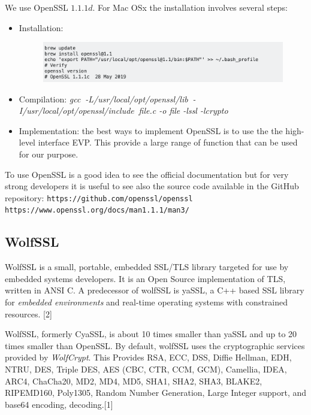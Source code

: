 \documentclass[11pt]{article}
\begin{document}
We use OpenSSL $1.1.1d$. For Mac OSx the installation involves several steps:
\begin{itemize}
\item Installation:
\begin{figure}[!ht]
 \includegraphics[width=1\textwidth]{pic1-hw4-1635747}
 \label{fig:OpenSSL Mac Installation}
\end{figure}

\item Compilation:\newline
{\em gcc$\;\;$-L/usr/local/opt/openssl/lib$\;\;$-I/usr/local/opt/openssl/include$\;\;$file.c -o file -lssl -lcrypto}
\item Implementation: the best ways to implement OpenSSL is to use the the high-level interface EVP. This provide a large range of function that can be used for our purpose.

\end{itemize}

To use OpenSSL is a good idea to see the official documentation but for very strong developers it is useful to see also the source code available in the GitHub repository:\newline
\verb|https://github.com/openssl/openssl|\newline
\verb|https://www.openssl.org/docs/man1.1.1/man3/|

\subsection{WolfSSL}
WolfSSL is a small, portable, embedded SSL/TLS library targeted for use by embedded systems developers. It is an Open Source implementation of TLS, written in ANSI C. A predecessor of wolfSSL is yaSSL, a C++ based SSL library for {\em embedded environments} and real-time operating systems with constrained resources. [2]

WolfSSL, formerly CyaSSL, is about 10 times smaller than yaSSL and up to 20 times smaller than OpenSSL. By default, wolfSSL uses the cryptographic services provided by {\em WolfCrypt}. This Provides RSA, ECC, DSS, Diffie Hellman, EDH, NTRU, DES, Triple DES, AES (CBC, CTR, CCM, GCM), Camellia, IDEA, ARC4, ChaCha20, MD2, MD4, MD5, SHA1, SHA2, SHA3, BLAKE2, RIPEMD160, Poly1305, Random Number Generation, Large Integer support, and base64 encoding, decoding.[1]
\end{document}
